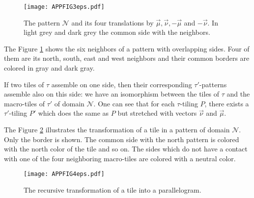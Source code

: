 \documentclass{llncs}
\newcommand{\nn}{\vec\nu}
\newcommand{\mm}{\vec \mu}
\begin{document}
\begin{figure}
\begin{center}
\texttt{[image: APPFIG3eps.pdf]}
\end{center}
\caption{The pattern $\mathcal{N}$ and its four translations by $\mm,\nn,-\mm$ and $-\nn$. In light grey and dark grey the common side with the neighbors.}
\label{FIGAPP3}
\end{figure}


The Figure \ref{FIGAPP3} shows the six neighbors of a pattern with overlapping sides. Four of them are its north,
south, east and west neighbors and their common borders are colored in gray and dark gray.

If two tiles of $\tau$ assemble on one side, then their corresponding $\tau'$-patterns assemble also on this
side: we have an isomorphism between the tiles of $\tau$ and the macro-tiles of $\tau'$ of domain $\mathcal{N}$.
One can see that for each $\tau$-tiling $P$, there exists a $\tau'$-tiling $P'$ which does the same as
$P$ but stretched with vectors $\nn$ and $\mm$.

The Figure \ref{FIGAPP4} illustrates the transformation of a tile in a pattern of domain $\mathcal{N}$. Only the border is
shown. The common side with the north pattern is colored with the north color of the tile and so on. The sides which
do not have a contact with one of the four neighboring macro-tiles are colored with a neutral color.



\begin{figure}[t]
\begin{center}
\texttt{[image: APPFIG4eps.pdf]}
\caption{The recursive transformation of a tile into a parallelogram.}
\label{FIGAPP4}
\end{center}
\end{figure}
\end{document}
